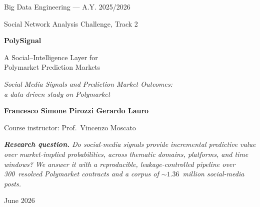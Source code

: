 \documentclass[11pt,a4paper]{report}
\begin{document}
\begin{titlepage}
\centering
\vspace*{1.2cm}
{\sffamily\small Big Data Engineering --- A.Y. 2025/2026\par}
{\sffamily\small Social Network Analysis Challenge, Track 2\par}
\vspace{1.4cm}

{\sffamily\bfseries\color{psblue}\Huge PolySignal\par}
\vspace{0.5cm}
{\sffamily\Large A Social--Intelligence Layer for\\[2pt] Polymarket Prediction Markets\par}
\vspace{0.9cm}
{\itshape\large Social Media Signals and Prediction Market Outcomes:\\ a data-driven study on Polymarket\par}

\vspace{1.6cm}

\vspace{1.4cm}
{\large\sffamily\bfseries Francesco Simone Pirozzi \quad\textbullet\quad Gerardo Lauro\par}
\vspace{0.4cm}
{\sffamily\small Course instructor: Prof.\ Vincenzo Moscato\par}

\vfill

\begin{minipage}{0.86\linewidth}
\small\itshape\color{psgrey}\centering
\textbf{Research question.} Do social-media signals provide incremental
predictive value over market-implied probabilities, across thematic domains,
platforms, and time windows? We answer it with a reproducible, leakage-controlled
pipeline over 300~resolved Polymarket contracts and a corpus of
${\sim}1.36$~million social-media posts.
\end{minipage}

\vspace{1.0cm}
{\sffamily\small June 2026\par}
\end{titlepage}
\end{document}
